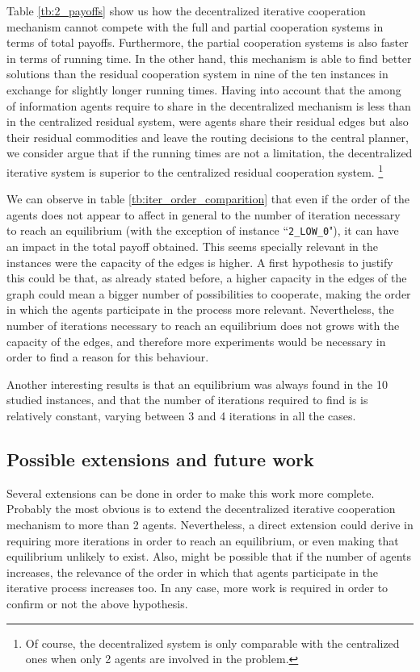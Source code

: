 \documentclass[authoryear]{elsarticle}
\begin{document}
Table \ref{tb:2_payoffs} show us how the decentralized iterative cooperation mechanism cannot compete with the full and partial cooperation systems in terms of total payoffs. Furthermore, the partial cooperation systems is also faster in terms of running time. In the other hand, this mechanism is able to find better solutions than the residual cooperation system in nine of the ten instances in exchange for slightly longer running times. Having into account that the among of information agents require to share in the decentralized mechanism is less than in the centralized residual system, were agents share their residual edges but also their residual commodities and leave the routing decisions to the central planner, we consider argue that if the running times are not a limitation, the decentralized iterative system is superior to the centralized residual cooperation system. \footnote{Of course, the decentralized system is only comparable with the centralized ones when only 2 agents are involved in the problem.}

We can observe in table \ref{tb:iter_order_comparition} that even if the order of the agents does not appear to affect in general to the number of iteration necessary to reach an equilibrium (with the exception of instance ``\texttt{2\_LOW\_0}"), it can have an impact in the total payoff obtained. This seems specially relevant in the instances were the capacity of the edges is higher. A first hypothesis to justify this could be that, as already stated before, a higher capacity in the edges of the graph could mean a bigger number of possibilities to cooperate, making the order in which the agents participate in the process more relevant. Nevertheless, the number of iterations necessary to reach an equilibrium does not grows with the capacity of the edges, and therefore more experiments would be necessary in order to find a reason for this behaviour. 

Another interesting results is that an equilibrium was always found in the 10 studied instances, and that the number of iterations required to find is is relatively constant, varying between 3 and 4 iterations in all the cases.
\subsection{Possible extensions and future work}

Several extensions can be done in order to make this work more complete. Probably the most obvious is to extend the decentralized iterative cooperation mechanism to more than 2 agents. Nevertheless, a direct extension could derive in requiring more iterations in order to reach an equilibrium, or even making that equilibrium unlikely to exist. Also, might be possible that if the number of agents increases, the relevance of the order in which that agents participate in the iterative process increases too. In any case, more work is required in order to confirm or not the above hypothesis.
\end{document}

